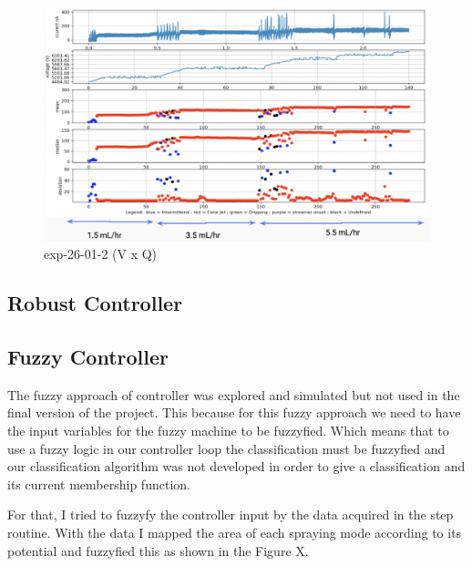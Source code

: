        \begin{figure}[H]
            \center
            \includegraphics[width=15cm]{Figuras/19:03/control_first_results.png}
            \caption{ exp-26-01-2 (V x Q)}
        \end{figure}


    \subsection{Robust Controller}

    \subsection{Fuzzy Controller}

        The fuzzy approach of controller was explored and simulated but not used in the final version of the project.
        This because for this fuzzy approach we need to have the input variables for the fuzzy machine to be fuzzyfied.
        Which means that to use a fuzzy logic in our controller loop the classification must be fuzzyfied and our classification algorithm was not developed in order to give a classification and its current membership function.

        For that, I tried to fuzzyfy the controller input by the data acquired in the step routine. With the data I mapped the area of each spraying mode according to its potential and fuzzyfied this as shown in the Figure X.

